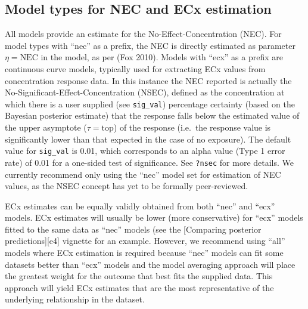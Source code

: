 \documentclass[10pt,a4paper,onecolumn]{article}
\begin{document}
\hypertarget{model-types-for-nec-and-ecx-estimation}{%
\subsection{Model types for NEC and ECx
estimation}\label{model-types-for-nec-and-ecx-estimation}}

All models provide an estimate for the No-Effect-Concentration (NEC).
For model types with ``nec'' as a prefix, the NEC is directly estimated
as parameter \(\eta = \text{NEC}\) in the model, as per (Fox 2010).
Models with ``ecx'' as a prefix are continuous curve models, typically
used for extracting ECx values from concentration response data. In this
instance the NEC reported is actually the
No-Significant-Effect-Concentration (NSEC), defined as the concentration
at which there is a user supplied (see \texttt{sig\_val}) percentage
certainty (based on the Bayesian posterior estimate) that the response
falls below the estimated value of the upper asymptote
(\(\tau = \text{top}\)) of the response (i.e.~the response value is
significantly lower than that expected in the case of no exposure). The
default value for \texttt{sig\_val} is 0.01, which corresponds to an
alpha value (Type 1 error rate) of 0.01 for a one-sided test of
significance. See \texttt{?nsec} for more details. We currently
recommend only using the ``nec'' model set for estimation of NEC values,
as the NSEC concept has yet to be formally peer-reviewed.

ECx estimates can be equally validly obtained from both ``nec'' and
``ecx'' models. ECx estimates will usually be lower (more conservative)
for ``ecx'' models fitted to the same data as ``nec'' models (see the
{[}Comparing posterior predictions{]}{[}e4{]} vignette for an example.
However, we recommend using ``all'' models where ECx estimation is
required because ``nec'' models can fit some datasets better than
``ecx'' models and the model averaging approach will place the greatest
weight for the outcome that best fits the supplied data. This approach
will yield ECx estimates that are the most representative of the
underlying relationship in the dataset.
\end{document}
